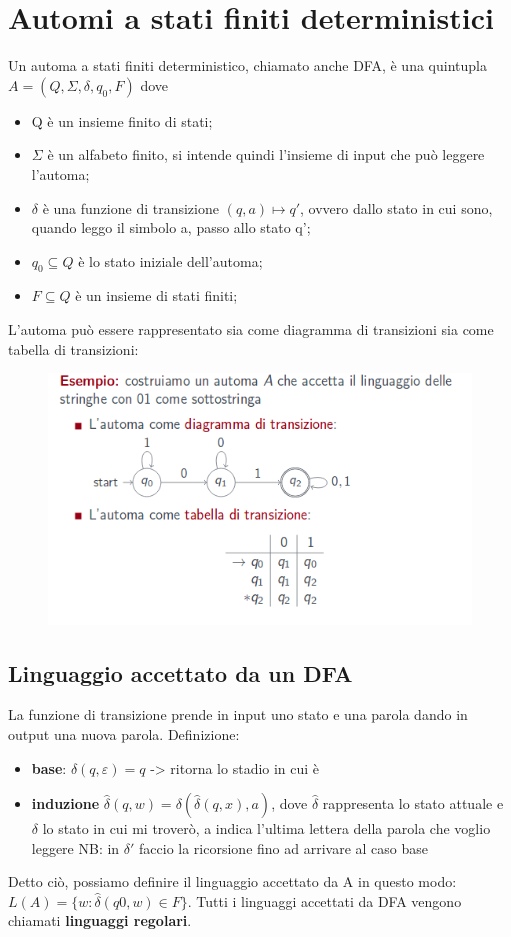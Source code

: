 \chapter{Automi a stati finiti deterministici}
Un automa a stati finiti deterministico, chiamato anche DFA, è una quintupla
$A=(Q, \Sigma, \delta, q_0, F)$ dove
\begin{itemize}
\item Q è un insieme finito di stati;
\item $\Sigma$ è un alfabeto finito, si intende quindi l'insieme di
input che può leggere l'automa;
\item $\delta$ è una funzione di transizione $(q,a) \mapsto q'$, ovvero 
dallo stato in cui sono, quando leggo il simbolo a, passo allo stato q';
\item $q_0 \subseteq Q$ è lo stato iniziale dell'automa;
\item $F \subseteq Q$ è un insieme di stati finiti;
\end{itemize}
L'automa può essere rappresentato sia come diagramma di transizioni sia come tabella
di transizioni: 

\begin{figure}[h]
\centering 
\includegraphics[scale=0.5]{Immagini/DFA.png}
\end{figure}

\section{Linguaggio accettato da un DFA} 
La funzione di transizione prende in input uno stato e una parola dando in output
una nuova parola. Definizione:
\begin{itemize}
\item \textbf{base}: $\delta(q,\varepsilon)=q$ -> ritorna lo stadio in cui è
\item \textbf{induzione} $\widehat{\delta}(q,w)=\delta(\widehat{\delta}(q,x),a)$, 
dove $\widehat{\delta}$ rappresenta lo stato attuale e $\delta$ lo stato in cui mi 
troverò, a indica l'ultima lettera della parola che voglio leggere
NB: in $\delta'$ faccio la ricorsione fino ad arrivare al caso base 
\end{itemize}
Detto ciò, possiamo definire il linguaggio accettato da A in questo modo:
$L(A)=\{w: \widehat{\delta}(q0,w) \in F\}$. Tutti i linguaggi accettati da DFA 
vengono chiamati \textbf{linguaggi regolari}.